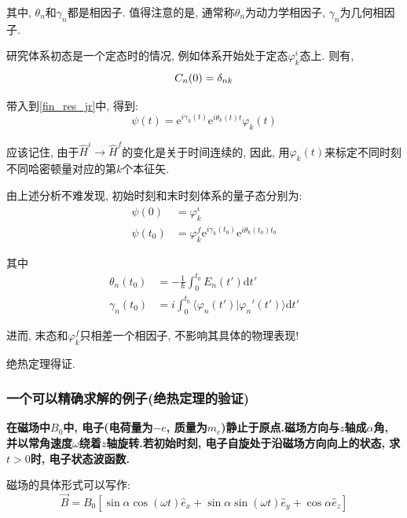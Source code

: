 \documentclass[a4paper, 11pt]{article}
\begin{document}
\begin{spacing}{1.2}
        其中, $\theta_n$和$\gamma_n$都是相因子.
        值得注意的是, 通常称$\theta_n$为动力学相因子, $\gamma_n$为几何相因子.

        研究体系初态是一个定态时的情况, 例如体系开始处于定态$\varphi_k^i$态上. 则有, 
        \begin{equation}
          C_n(0) = \delta_{nk}\notag
        \end{equation}

        带入到\eqref{fin_res_jr}中, 得到: 
        \begin{equation}
          \psi(t) = \mathrm{e}^{i\gamma_k(t)}\mathrm{e}^{i\theta_k(t)t}\varphi_k(t)
        \end{equation}
        
        应该记住, 由于$\hat{H}^i\to\hat{H}^f$的变化是关于时间连续的, 因此, 用$\varphi_k(t)$来标定不同时刻
        不同哈密顿量对应的第$k$个本征矢.
      
        由上述分析不难发现, 初始时刻和末时刻体系的量子态分别为:
        \begin{equation}
          \begin{aligned}
            \psi(0) &= \varphi_k^i\\
            \psi(t_0) &= \varphi_k^f\mathrm{e}^{i\gamma_k(t_0)}\mathrm{e}^{i\theta_k(t_0)t_0}
          \end{aligned}  
        \end{equation}

        其中
        \begin{equation}
          \begin{aligned}
            \theta_n(t_0) &= -\frac{1}{\hbar}\int_0^{t_0}E_n(t')\mathrm{d}t'\\
            \gamma_n(t_0) &= i\int_0^{t_0}\langle\varphi_n(t')|\varphi_n'(t')\rangle{}\mathrm{d}t'
          \end{aligned}
        \end{equation}
        
        进而, 末态和$\varphi_k^f$只相差一个相因子, 不影响其具体的物理表现!
        \par
        绝热定理得证.

      \subsubsection{一个可以精确求解的例子(绝热定理的验证)}
        \textbf{在磁场中$B_0$中, 电子(电荷量为$-e$, 质量为$m_e$)静止于原点.磁场方向与$z$轴成$\alpha$角,
        并以常角速度$\omega$绕着$z$轴旋转.若初始时刻, 电子自旋处于沿磁场方向向上的状态, 求$t>0$时, 电子状态波函数.}
        \par
        磁场的具体形式可以写作:    
        \begin{equation}
          \vec{B} = B_0\left[\sin\alpha\cos(\omega{}t)\hat{e}_x + 
                             \sin\alpha\sin(\omega{}t)\hat{e}_y +
                             \cos\alpha\hat{e}_z
                       \right]
        \end{equation}
         

\end{spacing}
\end{document}
